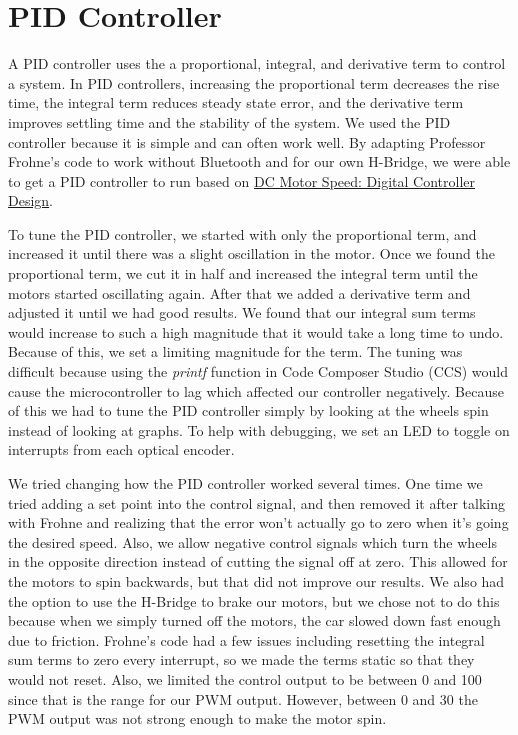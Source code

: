 \documentclass{article}
\begin{document}
\section{PID Controller}
A PID controller uses the a proportional, integral, and derivative term to control a system. In PID controllers, increasing the proportional term decreases the rise time, the integral term reduces steady state error, and the derivative term improves settling time and the stability of the system. We used the PID controller because it is simple and can often work well. By adapting Professor Frohne's code to work without Bluetooth and for our own H-Bridge, we were able to get a PID controller to run based on \href{http://ctms.engin.umich.edu/CTMS/index.php?example=MotorSpeed&section=ControlDigital}{DC Motor Speed: Digital Controller Design}.

To tune the PID controller, we started with only the proportional term, and increased it until there was a slight oscillation in the motor. Once we found the proportional term, we cut it in half and increased the integral term until the motors started oscillating again. After that we added a derivative term and adjusted it until we had good results. We found that our integral sum terms would increase to such a high magnitude that it would take a long time to undo. Because of this, we set a limiting magnitude for the term. The tuning was difficult because using the \textit{printf} function in Code Composer Studio (CCS) would cause the microcontroller to lag which affected our controller negatively. Because of this we had to tune the PID controller simply by looking at the wheels spin instead of looking at graphs. To help with debugging, we set an LED to toggle on interrupts from each optical encoder.

We tried changing how the PID controller worked several times. One time we tried adding a set point into the control signal, and then removed it after talking with Frohne and realizing that the error won't actually go to zero when it's going the desired speed. Also, we allow negative control signals which turn the wheels in the opposite direction instead of cutting the signal off at zero. This allowed for the motors to spin backwards, but that did not improve our results. We also had the option to use the H-Bridge to brake our motors, but we chose not to do this because when we simply turned off the motors, the car slowed down fast enough due to friction. Frohne's code had a few issues including resetting the integral sum terms to zero every interrupt, so we made the terms static so that they would not reset. Also, we limited the control output to be between 0 and 100 since that is the range for our PWM output. However, between 0 and 30 the PWM output was not strong enough to make the motor spin.
\end{document}
